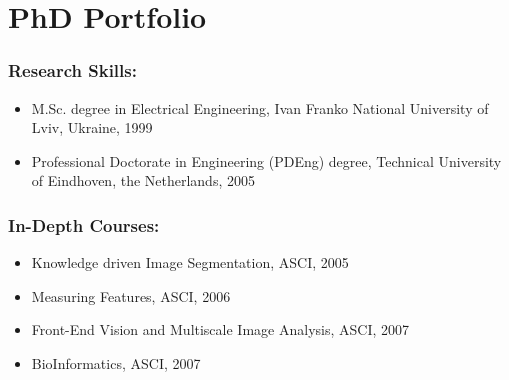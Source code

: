 %
%

\noquote
\orgchpos
\chapter*{PhD Portfolio}

\noindent

\subsection*{Research Skills:}
\vspace{1ex}
\begin{itemize}
\item M.Sc. degree in Electrical Engineering, Ivan Franko
National University of Lviv, Ukraine, 1999

\item Professional Doctorate in Engineering (PDEng) degree, Technical
University of Eindhoven, the Netherlands, 2005
\end{itemize}

\subsection*{In-Depth Courses:}
\vspace{1ex}
\begin{itemize}
\item Knowledge driven Image Segmentation, ASCI, 2005
\item Measuring Features, ASCI, 2006
\item Front-End Vision and Multiscale Image Analysis, ASCI, 2007
\item BioInformatics, ASCI, 2007
\end{itemize}


